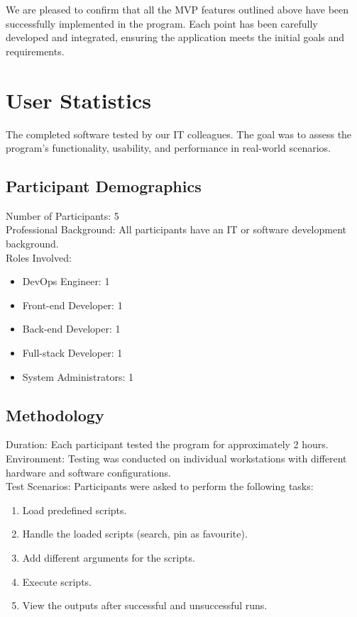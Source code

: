 \documentclass{article}
\begin{document}
We are pleased to confirm that all the MVP features outlined above have been successfully implemented in the program. Each point has been carefully developed and integrated, ensuring the application meets the initial goals and requirements.

\clearpage

\section{User Statistics}
The completed software tested by our IT colleagues. The goal was to assess the program's functionality, usability, and performance in real-world scenarios.

\subsection{Participant Demographics}
Number of Participants: 5\\
Professional Background: All participants have an IT or software development background. \\
Roles Involved:
\begin{itemize}
    \item DevOps Engineer: 1
    \item Front-end Developer: 1
    \item Back-end Developer: 1
    \item Full-stack Developer: 1
    \item System Administrators: 1
\end{itemize}

\subsection{Methodology}
Duration: Each participant tested the program for approximately 2 hours. \\
Environment: Testing was conducted on individual workstations with different hardware and software configurations. \\
Test Scenarios: Participants were asked to perform the following tasks:
\begin{enumerate}
    \item Load predefined scripts.
    \item Handle the loaded scripts (search, pin as favourite).
    \item Add different arguments for the scripts.
    \item Execute scripts.
    \item View the outputs after successful and unsuccessful runs.
\end{enumerate}
\end{document}
